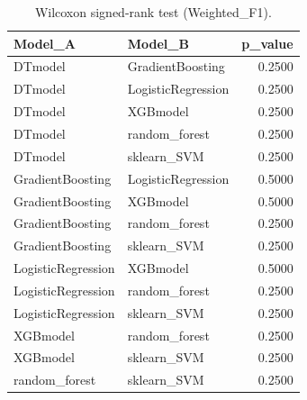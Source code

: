 \begin{table}[t]
\centering
\begin{tabular}{llr}
\toprule
Model_A & Model_B & p_value \\
\midrule
DTmodel & GradientBoosting & 0.2500 \\
DTmodel & LogisticRegression & 0.2500 \\
DTmodel & XGBmodel & 0.2500 \\
DTmodel & random_forest & 0.2500 \\
DTmodel & sklearn_SVM & 0.2500 \\
GradientBoosting & LogisticRegression & 0.5000 \\
GradientBoosting & XGBmodel & 0.5000 \\
GradientBoosting & random_forest & 0.2500 \\
GradientBoosting & sklearn_SVM & 0.2500 \\
LogisticRegression & XGBmodel & 0.5000 \\
LogisticRegression & random_forest & 0.2500 \\
LogisticRegression & sklearn_SVM & 0.2500 \\
XGBmodel & random_forest & 0.2500 \\
XGBmodel & sklearn_SVM & 0.2500 \\
random_forest & sklearn_SVM & 0.2500 \\
\bottomrule
\end{tabular}
\caption{Wilcoxon signed-rank test (Weighted_F1).}
\label{tab:wilcoxon_Weighted_F1}
\end{table}